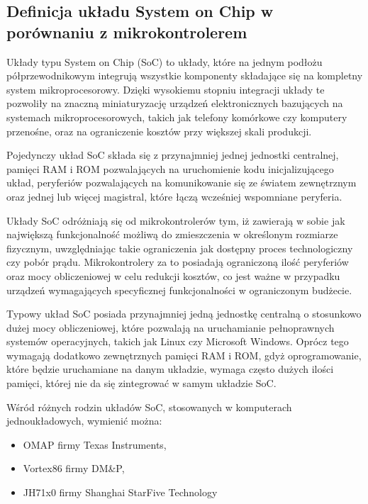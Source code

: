 
\subsection{Definicja układu System on Chip w porównaniu z mikrokontrolerem}

Układy typu System on Chip (SoC) to układy, które na jednym podłożu półprzewodnikowym integrują wszystkie komponenty składające się na kompletny system mikroprocesorowy. Dzięki wysokiemu stopniu integracji układy te pozwoliły na znaczną miniaturyzację urządzeń elektronicznych bazujących na systemach mikroprocesorowych, takich jak telefony komórkowe czy komputery przenośne, oraz na ograniczenie kosztów przy większej skali produkcji.

Pojedynczy układ SoC składa się z przynajmniej jednej jednostki centralnej, pamięci RAM i ROM pozwalających na uruchomienie kodu inicjalizującego układ, peryferiów pozwalających na komunikowanie się ze światem zewnętrznym oraz jednej lub więcej magistral, które łączą wcześniej wspomniane peryferia.

Układy SoC odróżniają się od mikrokontrolerów tym, iż zawierają w sobie jak największą funkcjonalność możliwą do zmieszczenia w określonym rozmiarze fizycznym, uwzględniając takie ograniczenia jak dostępny proces technologiczny czy pobór prądu. Mikrokontrolery za to posiadają ograniczoną ilość peryferiów oraz mocy obliczeniowej w celu redukcji kosztów, co jest ważne w przypadku urządzeń wymagających specyficznej funkcjonalności w ograniczonym budżecie.

Typowy układ SoC posiada przynajmniej jedną jednostkę centralną o stosunkowo dużej mocy obliczeniowej, które pozwalają na uruchamianie pełnoprawnych systemów operacyjnych, takich jak Linux czy Microsoft Windows. Oprócz tego wymagają dodatkowo zewnętrznych pamięci RAM i ROM, gdyż oprogramowanie, które będzie uruchamiane na danym układzie, wymaga często dużych ilości pamięci, której nie da się zintegrować w samym układzie SoC.


Wśród różnych rodzin układów SoC, stosowanych w komputerach jednoukładowych, wymienić można:
\begin{itemize}
	\item OMAP\cite{omap3530} firmy Texas Instruments,
	\item Vortex86\cite{vortex86ex2} firmy DM\&P,
	\item JH71x0\cite{jh7110} firmy Shanghai StarFive Technology
\end{itemize}


